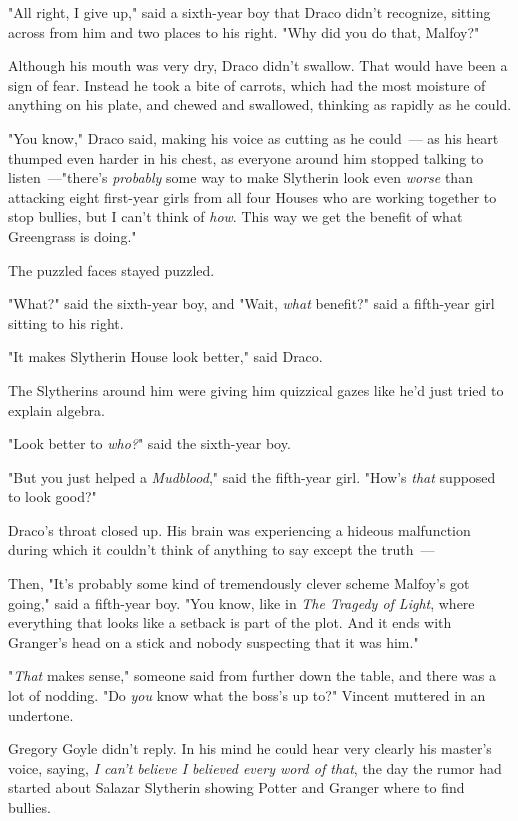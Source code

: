 "All right, I give up," said a sixth-year boy that Draco didn't recognize,
sitting across from him and two places to his right. "Why did you do that,
Malfoy?"

Although his mouth was very dry, Draco didn't swallow. That would have been a
sign of fear. Instead he took a bite of carrots, which had the most moisture of
anything on his plate, and chewed and swallowed, thinking as rapidly as he
could.

"You know," Draco said, making his voice as cutting as he could~--- as his heart
thumped even harder in his chest, as everyone around him stopped talking to
listen~---"there's \emph{probably} some way to make Slytherin look even
\emph{worse} than attacking eight first-year girls from all four Houses who are
working together to stop bullies, but I can't think of \emph{how}. This way we
get the benefit of what Greengrass is doing."

The puzzled faces stayed puzzled.

"What?" said the sixth-year boy, and "Wait, \emph{what} benefit?" said a
fifth-year girl sitting to his right.

"It makes Slytherin House look better," said Draco.

The Slytherins around him were giving him quizzical gazes like he'd just tried
to explain algebra.

"Look better to \emph{who?}" said the sixth-year boy.

"But you just helped a \emph{Mudblood}," said the fifth-year girl. "How's
\emph{that} supposed to look good?"

Draco's throat closed up. His brain was experiencing a hideous malfunction
during which it couldn't think of anything to say except the truth~---

Then, "It's probably some kind of tremendously clever scheme Malfoy's got
going," said a fifth-year boy. "You know, like in \emph{The Tragedy of Light},
where everything that looks like a setback is part of the plot. And it ends
with Granger's head on a stick and nobody suspecting that it was him."

"\emph{That} makes sense," someone said from further down the table, and there
was a lot of nodding.
\sbreak
"Do \emph{you} know what the boss's up to?" Vincent muttered in an undertone.

Gregory Goyle didn't reply. In his mind he could hear very clearly his master's
voice, saying, \emph{I can't believe I believed every word of that}, the day
the rumor had started about Salazar Slytherin showing Potter and Granger where
to find bullies.

